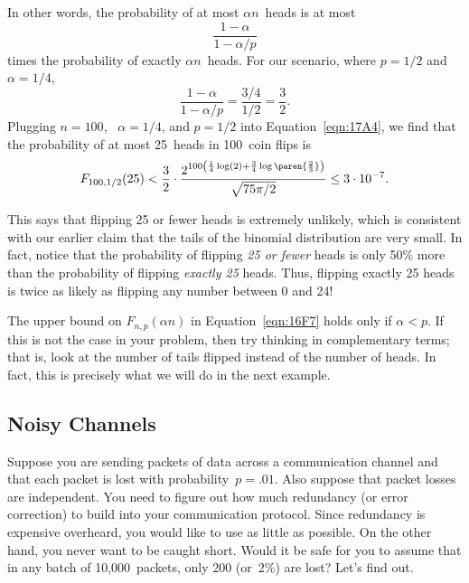 In other words, the probability of at most $\alpha n$~heads is at most
\begin{equation*}
    \frac{1 - \alpha}{1 - \alpha/p}
\end{equation*}
times the probability of exactly $\alpha n$~heads. For our scenario,
where $p = 1/2$ and $\alpha = 1/4$,
\begin{equation*}
\frac{1 - \alpha}{1 - \alpha/p}
    = \frac{3/4}{1/2} %
    = \frac{3}{2}.
\end{equation*}
Plugging $n = 100$, \ $\alpha = 1/4$, and $p = 1/2$ into
Equation~\ref{eqn:17A4}, we find that the probability of at most
25~heads in 100~coin flips is
\begin{equation*}
F_{100, 1/2}(25)
    < \frac{3}{2} \cdot
        \frac{  \displaystyle
                2^{100 \left( \frac{1}{4} \log(2)
                     + \frac{3}{4} \log\paren{\frac{2}{3}} \right) }
             }
             { \sqrt{75 \pi /2} } %
    \le 3 \cdot 10^{-7}.
\end{equation*}

This says that flipping 25 or fewer heads is extremely unlikely, which
is consistent with our earlier claim that the tails of the binomial
distribution are very small.  In fact, notice that the probability of
flipping \emph{25 or fewer} heads is only 50\% more than the
probability of flipping \emph{exactly 25} heads.  Thus, flipping
exactly 25 heads is twice as likely as flipping any number between 0
and 24!

\begin{caveat}
The upper bound on $F_{n, p}(\alpha n)$ in Equation~\ref{eqn:16F7}
holds only if $\alpha < p$.  If this is not the case in your problem,
then try thinking in complementary terms; that is, look at the number
of tails flipped instead of the number of heads.  In fact, this is
precisely what we will do in the next example.
\end{caveat}

\subsection{Noisy Channels}

Suppose you are sending packets of data across a communication channel
and that each packet is lost with probability~$p = .01$.  Also suppose
that packet losses are independent.  You need to figure out how much
redundancy (or error correction) to build into your communication
protocol.  Since redundancy is expensive overheard, you would like to
use as little as possible.  On the other hand, you never want to be
caught short.  Would it be safe for you to assume that in any batch
of 10,000~packets, only 200 (or~2\%) are lost?  Let's find out.

